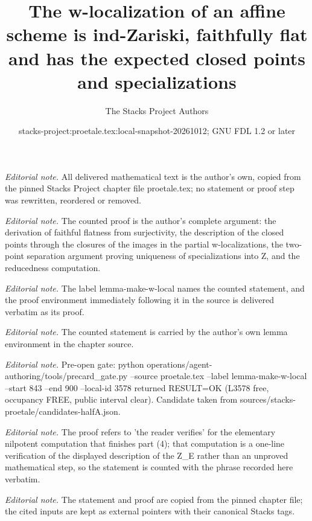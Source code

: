 \documentclass[10pt,a4paper]{amsart}
\title{The w-localization of an affine scheme is ind-Zariski, faithfully flat and has the expected closed points and specializations}
\author{The Stacks Project Authors}
\date{stacks-project:proetale.tex:local-snapshot-20261012; GNU FDL 1.2 or later}
\theoremstyle{plain}
\theoremstyle{definition}
\theoremstyle{remark}
\numberwithin{equation}{subsection}
\begin{document}
\maketitle
\noindent\textit{Editorial note.} All delivered mathematical text is the author's own, copied from the pinned Stacks Project chapter file proetale.tex; no statement or proof step was rewritten, reordered or removed.\par\medskip
\noindent\textit{Editorial note.} The counted proof is the author's complete argument: the derivation of faithful flatness from surjectivity, the description of the closed points through the closures of the images in the partial w-localizations, the two-point separation argument proving uniqueness of specializations into Z, and the reducedness computation.\par\medskip
\noindent\textit{Editorial note.} The label lemma-make-w-local names the counted statement, and the proof environment immediately following it in the source is delivered verbatim as its proof.\par\medskip
\noindent\textit{Editorial note.} The counted statement is carried by the author's own lemma environment in the chapter source.\par\medskip
\noindent\textit{Editorial note.} Pre-open gate: python operations/agent-authoring/tools/precard\_gate.py --source proetale.tex --label lemma-make-w-local --start 843 --end 900 --local-id 3578 returned RESULT=OK (L3578 free, occupancy FREE, public interval clear). Candidate taken from sources/stacks-proetale/candidates-halfA.json.\par\medskip
\noindent\textit{Editorial note.} The proof refers to 'the reader verifies' for the elementary nilpotent computation that finishes part (4); that computation is a one-line verification of the displayed description of the Z\_E rather than an unproved mathematical step, so the statement is counted with the phrase recorded here verbatim.\par\medskip
\noindent\textit{Editorial note.} The statement and proof are copied from the pinned chapter file; the cited inputs are kept as external pointers with their canonical Stacks tags.\par\medskip
\end{document}
